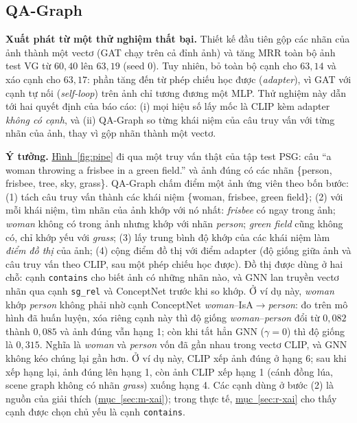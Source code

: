 \documentclass[conference]{IEEEtran}
\begin{document}
\subsection{QA-Graph}\label{sec:m-qa}
\textbf{Xuất phát từ một thử nghiệm thất bại.} Thiết kế đầu tiên gộp các nhãn của ảnh thành một vectơ (GAT chạy trên cả đỉnh ảnh) và tăng MRR toàn bộ ảnh test VG từ $60{,}40$ lên $63{,}19$ (seed 0). Tuy nhiên, bỏ toàn bộ cạnh cho $63{,}14$ và xáo cạnh cho $63{,}17$: phần tăng đến từ phép chiếu học được (\emph{adapter}), vì GAT với cạnh tự nối (\emph{self-loop}) trên ảnh chỉ tương đương một MLP. Thử nghiệm này dẫn tới hai quyết định của báo cáo: (i) mọi hiệu số lấy mốc là CLIP kèm adapter \emph{không có cạnh}, và (ii) QA-Graph so từng khái niệm của câu truy vấn với từng nhãn của ảnh, thay vì gộp nhãn thành một vectơ.

\textbf{Ý tưởng.} \hyperref[fig:pipe]{Hình~\ref*{fig:pipe}} đi qua một truy vấn thật của tập test PSG: câu ``a woman throwing a frisbee in a green field.'' và ảnh đúng có các nhãn \{person, frisbee, tree, sky, grass\}. QA-Graph chấm điểm một ảnh ứng viên theo bốn bước: (1) tách câu truy vấn thành các khái niệm \{woman, frisbee, green field\}; (2) với mỗi khái niệm, tìm nhãn của ảnh khớp với nó nhất: \emph{frisbee} có ngay trong ảnh; \emph{woman} không có trong ảnh nhưng khớp với nhãn \emph{person}; \emph{green field} cũng không có, chỉ khớp yếu với \emph{grass}; (3) lấy trung bình độ khớp của các khái niệm làm \emph{điểm đồ thị} của ảnh; (4) cộng điểm đồ thị với điểm adapter (độ giống giữa ảnh và câu truy vấn theo CLIP, sau một phép chiếu học được). Đồ thị được dùng ở hai chỗ: cạnh \texttt{contains} cho biết ảnh có những nhãn nào, và GNN lan truyền vectơ nhãn qua cạnh \texttt{sg\_rel} và ConceptNet trước khi so khớp. Ở ví dụ này, \emph{woman} khớp \emph{person} không phải nhờ cạnh ConceptNet \emph{woman}--IsA$\to$\emph{person}: đo trên mô hình đã huấn luyện, xóa riêng cạnh này thì độ giống \emph{woman}--\emph{person} đổi từ $0{,}082$ thành $0{,}085$ và ảnh đúng vẫn hạng 1; còn khi tắt hẳn GNN ($\gamma=0$) thì độ giống là $0{,}315$. Nghĩa là \emph{woman} và \emph{person} vốn đã gần nhau trong vectơ CLIP, và GNN không kéo chúng lại gần hơn. Ở ví dụ này, CLIP xếp ảnh đúng ở hạng 6; sau khi xếp hạng lại, ảnh đúng lên hạng 1, còn ảnh CLIP xếp hạng 1 (cánh đồng lúa, scene graph không có nhãn \emph{grass}) xuống hạng 4. Các cạnh dùng ở bước (2) là nguồn của giải thích (\hyperref[sec:m-xai]{mục~\ref*{sec:m-xai}}); trong thực tế, \hyperref[sec:r-xai]{mục~\ref*{sec:r-xai}} cho thấy cạnh được chọn chủ yếu là cạnh \texttt{contains}.
\end{document}
